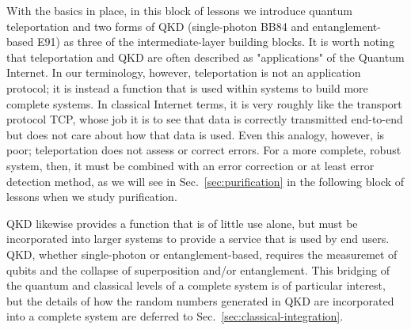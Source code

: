 
\begin{partintro}
With the basics in place, in this block of lessons we introduce quantum teleportation and two forms of QKD (single-photon BB84 and entanglement-based E91) as three of the intermediate-layer building blocks.  It is worth noting that teleportation and QKD are often described as "applications" of the Quantum Internet. In our terminology, however, teleportation is not an application protocol; it is instead a function that is used within systems to build more complete systems. In classical Internet terms, it is very roughly like the transport protocol TCP, whose job it is to see that data is correctly transmitted end-to-end but does not care about how that data is used. Even this analogy, however, is poor; teleportation does not assess or correct errors. For a more complete, robust system, then, it must be combined with an error correction or at least error detection method, as we will see in Sec.~\ref{sec:purification} in the following block of lessons when we study purification.

QKD likewise provides a function that is of little use alone, but must be incorporated into larger systems to provide a service that is used by end users. QKD, whether single-photon or entanglement-based, requires the measuremet of qubits and the collapse of superposition and/or entanglement. This bridging of the quantum and classical levels of a complete system is of particular interest, but the details of how the random numbers generated in QKD are incorporated into a complete system are deferred to Sec.~\ref{sec:classical-integration}.
\end{partintro}
